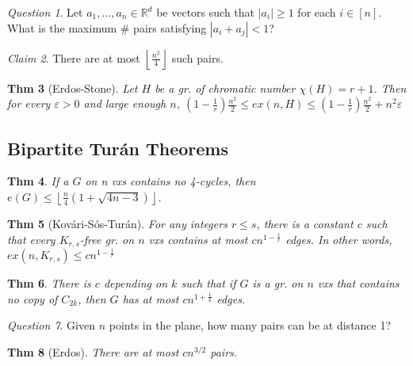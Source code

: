 \documentclass[11pt, fleqn, a4paper, landscape]{article}
\theoremstyle{plain} %
\newtheorem{thm}{Thm}
\theoremstyle{remark} %
\newtheorem{claim}[thm]{Claim}
\newtheorem{que}[thm]{Question}
\theoremstyle{definition} %
\newtheorem{defi}[thm]{Def}
\begin{document}
\begin{multicols}{5}
\begin{que}
Let $a_1, \dots , a_n \in \mathbb{R}^d$ be vectors such that $|a_i|\ge 1$ for each $i \in [n]$. What is the maximum \# pairs satisfying $|a_i + a_j| < 1$?
\end{que}

\begin{claim}
There are at most $\left\lfloor \frac{n^2}{4}\right\rfloor$ such pairs.
\end{claim}

\addtocounter{thm}{1}
\begin{thm}[Erdos-Stone]
Let $H$ be a gr. of chromatic number $\chi(H) = r + 1$. Then for
every $\varepsilon > 0$ and large enough $n$, $\left(1-\frac{1}{r}\right)\frac{n^2}{2}\le ex(n,H)\le\left(1-\frac{1}{r}\right)\frac{n^2}{2}+n^2\varepsilon$
\end{thm}
 \addtocounter{thm}{1}
\subsection{Bipartite Turán Theorems}

\begin{thm}
If a $G$ on n vxs contains no 4-cycles, then $e(G)\le\left\lfloor\frac{n}{4}(1+\sqrt{4n-3})\right\rfloor$.
\end{thm}
\addtocounter{thm}{1}
\begin{thm}[Kovári-Sós-Turán]
For any integers $r \le s$, there is a constant $c$ such that every
$K_{r,s}$-free gr. on $n$ vxs contains at most $cn^{1-\frac{1}{r}}$ edges. In other words, $ex(n,K_{r,s}) \le cn^{1-\frac{1}{r}}$ 
\end{thm}

\begin{thm}
There is $c$ depending on $k$ such that if $G$ is a gr. on $n$ vxs that contains no copy of $C_{2k}$, then $G$ has at most $cn^{1+\frac{1}{k}}$ edges.
\end{thm}

\begin{que}
Given $n$ points in the plane, how many pairs can be at distance 1?
\end{que}

\begin{thm}[Erdos]
There are at most $cn^{3/2}$ pairs.
\end{thm}


\end{multicols}
\end{document}
